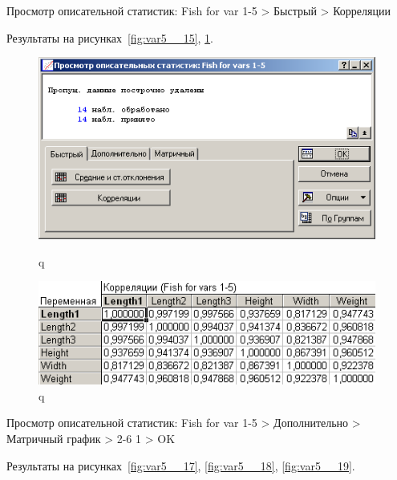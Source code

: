 Просмотр описательной статистик: Fish for var 1-5 > Быстрый > Корреляции

Результаты на рисунках~\ref{fig:var5__15}, \ref{fig:var5__16}.

\begin{figure}[!h]
  \centering
  \begin{minipage}{0.29\textwidth}
    \centering

    \includegraphics[width=0.99\textwidth]
    {inc/var5__15.PNG}

    \caption{q}
    \label{fig:var5__15}
  \end{minipage}
  \begin{minipage}{0.69\textwidth}
    \centering

    \includegraphics[width=0.99\textwidth]
    {inc/var5__16.PNG}

    \caption{q}
    \label{fig:var5__16}
  \end{minipage}
\end{figure}

Просмотр описательной статистик: Fish for var 1-5 > Дополнительно > Матричный график > 2-6 1 > OK

Результаты на рисунках~\ref{fig:var5__17}, \ref{fig:var5__18}, \ref{fig:var5__19}.

